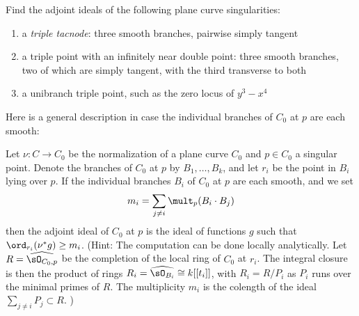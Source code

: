 \begin{exercise}
Find the adjoint ideals of the following plane curve singularities:
\begin{enumerate}
\item a \emph{triple tacnode}: three smooth branches, pairwise simply tangent
\item a triple point with an infinitely near double point: three smooth branches, two of which are simply tangent, with the third transverse to both
\item a unibranch triple point, such as the zero locus of $y^3-x^4$
\end{enumerate}
\end{exercise}

Here is a  general description in case the individual branches of $C_0$ at $p$ are each smooth:

\begin{exercise}
Let $\nu : C \to C_0$ be the normalization of a plane curve $C_0$ and $p \in C_0$ a singular point. Denote the branches of $C_0$ at $p$ by $B_1,\dots,B_k$, and let $r_i$ be the point in $B_i$ lying over $p$. If the individual branches $B_i$ of $C_0$ at $p$ are each smooth, and we set
$$
m_i = \sum_{j \neq i} \mult_p(B_i \cdot B_j)
$$
then the adjoint ideal of $C_0$ at $p$ is the ideal of functions $g$ such that $\ord_{r_i}(\nu^*g) \geq m_i$.
(Hint: The computation can be done locally analytically. Let $R = \widehat{\sO_{C_0, p}}$ be the completion of the local ring
of $C_0$ at $r_i$. The integral closure is then the product of rings $R_i = \widehat{\sO_{B_i}} \cong k[[t_i]]$,
with $R_i = R/P_i$ as $P_i$ runs over the minimal primes of $R$. The multiplicity
$m_i$ is the colength of the ideal $\sum_{j\neq i}P_j \subset R$.
)
\end{exercise}


